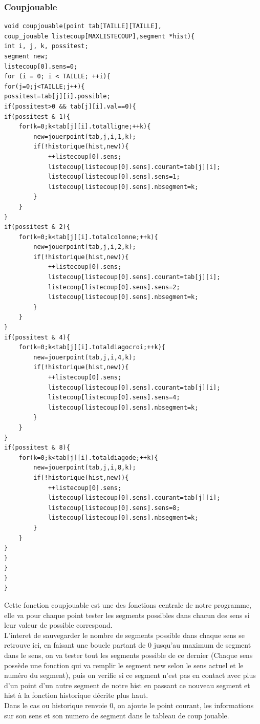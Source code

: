 \documentclass[11pt]{article}
\begin{document}
\subsubsection{Coupjouable}
\begin{lstlisting}
void coupjouable(point tab[TAILLE][TAILLE],
coup_jouable listecoup[MAXLISTECOUP],segment *hist){
int i, j, k, possitest;
segment new;
listecoup[0].sens=0;
for (i = 0; i < TAILLE; ++i){
for(j=0;j<TAILLE;j++){
possitest=tab[j][i].possible;
if(possitest>0 && tab[j][i].val==0){
if(possitest & 1){
	for(k=0;k<tab[j][i].totalligne;++k){
		new=jouerpoint(tab,j,i,1,k);
		if(!historique(hist,new)){
			++listecoup[0].sens;
			listecoup[listecoup[0].sens].courant=tab[j][i];
			listecoup[listecoup[0].sens].sens=1;
			listecoup[listecoup[0].sens].nbsegment=k;
		}
	}
}
if(possitest & 2){
	for(k=0;k<tab[j][i].totalcolonne;++k){
		new=jouerpoint(tab,j,i,2,k);
		if(!historique(hist,new)){
			++listecoup[0].sens;
			listecoup[listecoup[0].sens].courant=tab[j][i];
			listecoup[listecoup[0].sens].sens=2;
			listecoup[listecoup[0].sens].nbsegment=k;
		}
	}
}
if(possitest & 4){
	for(k=0;k<tab[j][i].totaldiagocroi;++k){
		new=jouerpoint(tab,j,i,4,k);
		if(!historique(hist,new)){
			++listecoup[0].sens;
			listecoup[listecoup[0].sens].courant=tab[j][i];
			listecoup[listecoup[0].sens].sens=4;
			listecoup[listecoup[0].sens].nbsegment=k;
		}
	}
}
if(possitest & 8){
	for(k=0;k<tab[j][i].totaldiagode;++k){
		new=jouerpoint(tab,j,i,8,k);
		if(!historique(hist,new)){
			++listecoup[0].sens;
			listecoup[listecoup[0].sens].courant=tab[j][i];
			listecoup[listecoup[0].sens].sens=8;
			listecoup[listecoup[0].sens].nbsegment=k;
		}
	}
}
}
}
}
}

\end{lstlisting}
Cette fonction coupjouable est une des fonctions centrale de notre programme, elle va pour chaque point tester les segments possibles dans chacun des sens si leur valeur de possible correspond.\\L'interet de sauvegarder le nombre de segments possible dans chaque sens se retrouve ici, en faisant une boucle partant de 0 jusqu'au maximum de segment dans le sens, on va tester tout les segments possible de ce dernier (Chaque sens possède une fonction qui va remplir le segment new selon le sens actuel et le numéro du segment), puis on verifie si ce segment n'est pas en contact avec plus d'un point d'un autre segment de notre hist en passant ce nouveau segment et hist à la fonction historique décrite plus haut.\\Dans le cas ou historique renvoie 0, on ajoute le point courant, les informations sur son sens et son numero de segment dans le tableau de coup jouable.\\
\end{document}
